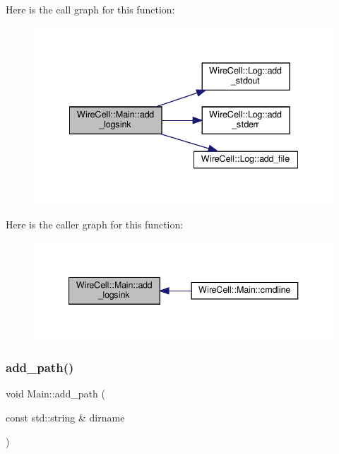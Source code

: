 Here is the call graph for this function\+:
\nopagebreak
\begin{figure}[H]
\begin{center}
\leavevmode
\includegraphics[width=335pt]{class_wire_cell_1_1_main_a50af5cb3b3f2cfb176febecd4a1613ce_cgraph}
\end{center}
\end{figure}
Here is the caller graph for this function\+:
\nopagebreak
\begin{figure}[H]
\begin{center}
\leavevmode
\includegraphics[width=340pt]{class_wire_cell_1_1_main_a50af5cb3b3f2cfb176febecd4a1613ce_icgraph}
\end{center}
\end{figure}
\mbox{\label{class_wire_cell_1_1_main_a5747c7dd28185179cb961b37d1b55a48}} 
\subsubsection{\texorpdfstring{add\+\_\+path()}{add\_path()}}
{\footnotesize\ttfamily void Main\+::add\+\_\+path (\begin{DoxyParamCaption}\item[{const std\+::string \&}]{dirname }\end{DoxyParamCaption})}

